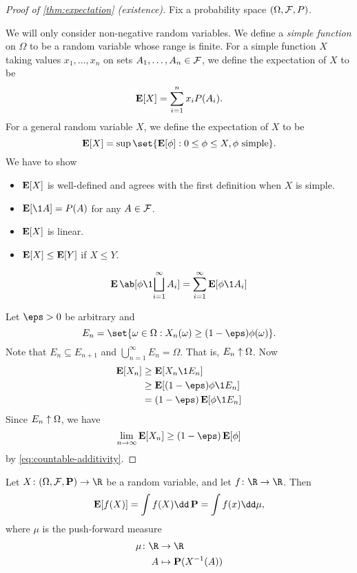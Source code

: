 
\begin{proof}[Proof of \cref{thm:expectation} (existence)]
    Fix a probability space $(\Omega, \mathcal F, P)$.

    We will only consider non-negative random variables.
    We define a \emph{simple function} on $\Omega$ to be a random variable
    whose range is finite.
    For a simple function $X$ taking values $x_1, \dots, x_n$ on
    sets $A_1, \dots, A_n \in \mathcal F$, we define the expectation of $X$ to be \[
        \operatorname{\mathbf E}[X] = \sum_{i=1}^n x_i P(A_i).
    \] For a general random variable $X$, we define the expectation of $X$
    to be \[
        \E[X] = \sup\set{\E[\phi] : 0 \le \phi \le X, \phi \text{ simple}}.
    \]
    We have to show
    \begin{itemize}
        \item $\operatorname{\mathbf E}[X]$ is well-defined and agrees with the first definition
            when $X$ is simple.
        \item $\E[\1A] = P(A)$ for any $A \in \mathcal F$.
        \item $\operatorname{\mathbf E}[X]$ is linear.
        \item $\operatorname{\mathbf E}[X] \le \operatorname{\mathbf E}[Y]$ if $X \le Y$.
    \end{itemize}
    \begin{equation}
        \E\ab[\phi \1{\bigsqcup_{i=1}^\infty A_i}]
            = \sum_{i=1}^\infty \E[\phi \1{A_i}]
            \label{eq:countable-additivity}
    \end{equation}

    Let $\eps > 0$ be arbitrary and \[
        E_n = \set{\omega \in \Omega : X_n(\omega) \ge
                (1 - \eps) \phi(\omega)}.
    \] Note that $E_n \subseteq E_{n+1}$ and
    $\bigcup_{n=1}^\infty E_n = \Omega$.
    That is, $E_n \uparrow \Omega$.
    Now \begin{align*}
        \E[X_n] &\ge \E[X_n \1{E_n}] \\
            &\ge \E[(1 - \eps) \phi \1{E_n}] \\
            &= (1 - \eps) \E[\phi \1{E_n}]
    \end{align*}
    Since $E_n \uparrow \Omega$, we have \[
        \lim_{n \to \infty} \E[X_n] \ge (1 - \eps) \E[\phi]
    \] by \cref{eq:countable-additivity}.
\end{proof}

\begin{proposition} \label{thm:simple-approx}
    Let $X\colon (\Omega, \F, \P) \to \R$ be a random variable,
    and let $f\colon \R \to \R$.
    Then \[
        \E[f(X)] = \int f(X) \dd \P = \int f(x) \dd \mu,
    \] where $\mu$ is the push-forward measure \begin{align*}
        \mu\colon \R &\to \R \\
        A &\mapsto \P(X^{-1}(A))
    \end{align*}
\end{proposition}
